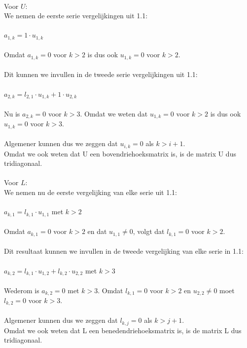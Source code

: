 \documentclass[a4paper]{article}
\begin{document}
\begin{tabbing}
\\ \textbullet{ }Voor $U$:
\\We nemen de eerste serie vergelijkingen uit 1.1:
\\{}
\\$a_{1,k} = 1 \cdot u_{1,k}$
\\{}
\\Omdat $a_{1,k} = 0$ voor $k > 2$ is dus ook $u_{1,k} = 0$ voor $k > 2$.
\\{}
\\Dit kunnen we invullen in de tweede serie vergelijkingen uit 1.1:
\\{}
\\$a_{2,k} = l_{2,1} \cdot u_{1,k} + 1 \cdot u_{2,k}$ 
\\{}
\\Nu is $a_{2,k} = 0$ voor $k > 3$. Omdat we weten dat $u_{1,k} = 0$ voor $k > 2$ is dus ook $u_{1,k} = 0$ voor $k > 3$.
\\{}
\\Algemener kunnen dus we zeggen dat $u_{i,k} = 0$ als $k > i + 1$. 
\\Omdat we ook weten dat U een bovendriehoeksmatrix is, is de matrix U dus tridiagonaal.
\\{}
\\ \textbullet { }Voor $L$:
\\We nemen nu de eerste vergelijking van elke serie uit 1.1:
\\{}
\\$a_{k,1} = l_{k,1} \cdot u_{1,1}$ met $k > 2$
\\{}
\\Omdat $a_{k,1} = 0$ voor $k > 2$ en dat $u_{1,1} \neq 0$, volgt dat $l_{k,1} = 0$ voor $k > 2$.
\\{}
\\Dit resultaat kunnen we invullen in de tweede vergelijking van elke serie in 1.1:
\\{}
\\$a_{k,2} = l_{k,1} \cdot u_{1,2} + l_{k,2} \cdot u_{2,2}$ met $k > 3$
\\{}
\\Wederom is $a_{k,2} = 0$ met $k > 3$. Omdat $l_{k,1} = 0$ voor $k > 2$ en $u_{2,2} \neq 0$ moet $l_{k,2} = 0$ voor $k > 3$.
\\{}
\\Algemener kunnen dus we zeggen dat $l_{k,j} = 0$ als $k > j + 1$. 
\\Omdat we ook weten dat L een benedendriehoeksmatrix is, is de matrix L dus tridiagonaal.
\\{}
\end{tabbing}
\end{document}
